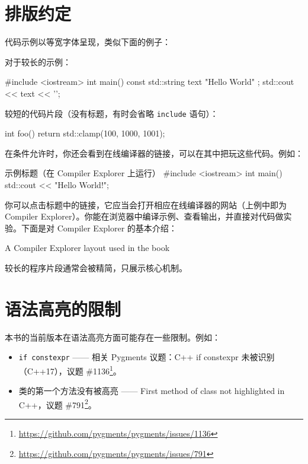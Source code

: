 \section{排版约定}

代码示例以等宽字体呈现，类似下面的例子：

对于较长的示例：

\begin{codebox}[cpp]
#include <iostream>
int main() {
const std::string text { "Hello World" };
std::cout << text << '\n';
}
\end{codebox}

较短的代码片段（没有标题，有时会省略 \texttt{include} 语句）：

\begin{codebox}[cpp]
int foo() {
return std::clamp(100, 1000, 1001);
}
\end{codebox}

在条件允许时，你还会看到在线编译器的链接，可以在其中把玩这些代码。例如：

\begin{codeboxt}[cpp]{示例标题（在 Compiler Explorer 上运行）}
#include <iostream>
int main() {
std::cout << "Hello World!";
}
\end{codeboxt}

你可以点击标题中的链接，它应当会打开相应在线编译器的网站（上例中即为 Compiler Explorer）。你能在浏览器中编译示例、查看输出，并直接对代码做实验。下面是对 Compiler Explorer 的基本介绍：

A Compiler Explorer layout used in the book

较长的程序片段通常会被精简，只展示核心机制。

\section{语法高亮的限制}

本书的当前版本在语法高亮方面可能存在一些限制。例如：

\begin{itemize}
\item \texttt{if constexpr} —— 相关 Pygments 议题：C++ if constexpr 未被识别（C++17），议题 \#1136\footnote{\url{https://github.com/pygments/pygments/issues/1136}}。
\item 类的第一个方法没有被高亮 —— First method of class not highlighted in C++，议题 \#791\footnote{\url{https://github.com/pygments/pygments/issues/791}}。
\end{itemize}


